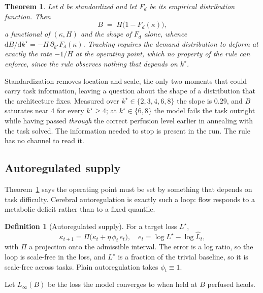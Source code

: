 \documentclass[10pt,twocolumn]{article}
\theoremstyle{plain}
\newtheorem{theorem}{Theorem}
\theoremstyle{definition}
\newtheorem{definition}{Definition}
\theoremstyle{remark}
\begin{document}
\begin{theorem}
\label{thm:impossible}
Let $d$ be standardized and let $F_d$ be its empirical distribution function. Then
\begin{equation}
  B \;=\; H\bigl(1 - F_d(\kappa)\bigr),
\end{equation}
a functional of $(\kappa, H)$ and the \emph{shape} of $F_d$ alone, whence
$\mathrm{d}B/\mathrm{d}k^\star = -H\,\partial_{k^\star} F_d(\kappa)$. Tracking requires the
demand distribution to deform at exactly the rate $-1/H$ at the operating point, which no
property of the rule can enforce, since the rule observes nothing that depends on
$k^\star$.
\end{theorem}

Standardization removes location and scale, the only two moments that could carry task
information, leaving a question about the shape of a distribution that the architecture
fixes. Measured over $k^\star \in \{2,3,4,6,8\}$ the slope is $0.29$, and $B$ saturates
near $4$ for every $k^\star \ge 4$; at $k^\star \in \{6,8\}$ the model fails the task
outright while having passed \emph{through} the correct perfusion level earlier in
annealing with the task solved. The information needed to stop is present in the run. The
rule has no channel to read it.

\subsection{Autoregulated supply}

Theorem~\ref{thm:impossible} says the operating point must be set by something that
depends on task difficulty. Cerebral autoregulation is exactly such a loop: flow responds
to a metabolic deficit rather than to a fixed quantile.

\begin{definition}[Autoregulated supply]
\label{def:autoreg}
For a target loss $L^\star$,
\begin{equation}
  \label{eq:loop}
  \kappa_{t+1} = \Pi\bigl(\kappa_t + \eta\,\phi_t\,e_t\bigr),
  \quad e_t = \log L^\star - \log \widehat{L}_t,
\end{equation}
with $\Pi$ a projection onto the admissible interval. The error is a log ratio, so the
loop is scale-free in the loss, and $L^\star$ is a fraction of the trivial baseline, so it
is scale-free across tasks. Plain autoregulation takes $\phi_t \equiv 1$.
\end{definition}

Let $L_\infty(B)$ be the loss the model converges to when held at $B$ perfused heads.
\end{document}
